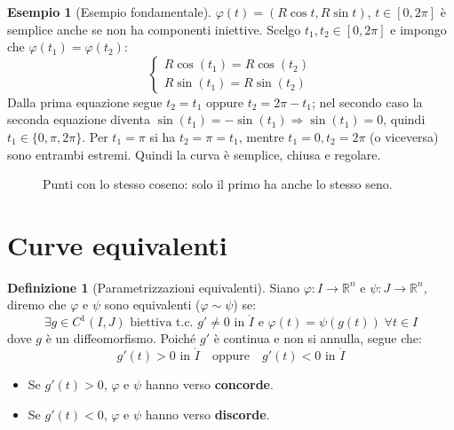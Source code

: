 \documentclass[11pt, a4paper, openright]{book}
\theoremstyle{plain}
\theoremstyle{definition}
\newtheorem{definizione}[teorema]{Definizione}
\newtheorem{esempio}[teorema]{Esempio}
\theoremstyle{remark}
\begin{document}
\begin{esempio}[Esempio fondamentale]\label{es:circonferenza_semplice}
    $\varphi(t) = (R\cos t, R\sin t)$, $t \in [0, 2\pi]$ è semplice anche se non ha componenti iniettive. Scelgo $t_1, t_2 \in [0, 2\pi]$ e impongo che $\varphi(t_1) = \varphi(t_2)$:
    \begin{equation}
        \begin{cases}
            R\cos(t_1) = R\cos(t_2) \\
            R\sin(t_1) = R\sin(t_2)
        \end{cases}
    \end{equation}
    Dalla prima equazione segue $t_2 = t_1$ oppure $t_2 = 2\pi - t_1$; nel secondo caso la seconda equazione diventa $\sin(t_1) = -\sin(t_1) \Longrightarrow \sin(t_1) = 0$, quindi $t_1 \in \{0, \pi, 2\pi\}$. Per $t_1 = \pi$ si ha $t_2 = \pi = t_1$, mentre $t_1 = 0, t_2 = 2\pi$ (o viceversa) sono entrambi estremi. Quindi la curva è semplice, chiusa e regolare.
\begin{figure}[H]
    \centering
    \caption{Punti con lo stesso coseno: solo il primo ha anche lo stesso seno.}
\end{figure}
\end{esempio}

\section{Curve equivalenti}
\begin{definizione}[Parametrizzazioni equivalenti]
    Siano $\varphi: I \longrightarrow \mathbb{R}^n$ e $\psi: J \longrightarrow \mathbb{R}^n$, diremo che $\varphi$ e $\psi$ sono equivalenti ($\varphi \sim \psi$) se:
    \begin{equation}
        \exists g \in C^1(I, J) \text{ biettiva t.c. } g' \neq 0 \text{ in } \mathring{I} \text{ e } \varphi(t) = \psi(g(t)) \; \forall t \in I
    \end{equation}
    dove $g$ è un diffeomorfismo. Poiché $g'$ è continua e non si annulla, segue che:
    \begin{equation}
        g'(t) > 0 \text{ in } \mathring{I} \quad \text{oppure} \quad g'(t) < 0 \text{ in } \mathring{I}
    \end{equation}
    \begin{itemize}
        \item Se $g'(t) > 0$, $\varphi$ e $\psi$ hanno verso \textbf{concorde}.
        \item Se $g'(t) < 0$, $\varphi$ e $\psi$ hanno verso \textbf{discorde}.
    \end{itemize}
\end{definizione}
\end{document}
